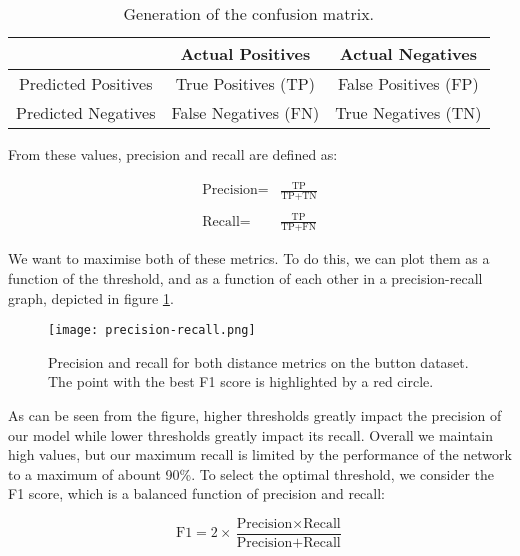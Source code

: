 \begin{table}[ht]
    \begin{center}
        \begin{tabular}{c||c|c}
            \space & Actual Positives & Actual Negatives\\
            \hline\hline
            Predicted Positives & True Positives (TP)& False Positives (FP)\\
            \hline
            Predicted Negatives & False Negatives (FN)& True Negatives (TN)\\
        \end{tabular}
        \caption{Generation of the confusion matrix.}
        \label{tab:cmatrix}
    \end{center}
\end{table}

From these values, precision and recall are defined as:

\begin{align*}
    \text{Precision} =& \frac{\text{TP}}{\text{TP}+\text{TN}} \\
    & \\
    \text{Recall} =& \frac{\text{TP}}{\text{TP}+\text{FN}}
\end{align*}

We want to maximise both of these metrics. To do this, we can plot them as a function of the threshold, and as a function of each other in a precision-recall graph, depicted in figure \ref{fig:precisionrecall}.

\begin{figure}[ht]
    \texttt{[image: precision-recall.png]}
    \caption{Precision and recall for both distance metrics on the button dataset. The point with the best F1 score is highlighted by a red circle.}
    \label{fig:precisionrecall}
\end{figure}

As can be seen from the figure, higher thresholds greatly impact the precision of our model while lower thresholds greatly impact its recall. Overall we maintain high values, but our maximum recall is limited by the performance of the network to a maximum of abount 90\%. To select the optimal threshold, we consider the F1 score, which is a balanced function of precision and recall:

\begin{equation*}
    \text{F1} = 2\times\frac{\text{Precision}\times\text{Recall}}{\text{Precision}+\text{Recall}}
\end{equation*}

